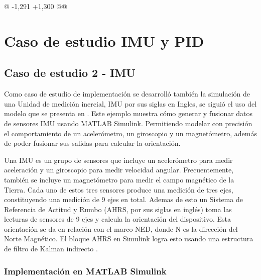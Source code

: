@ -1,291 +1,300 @@
\chapter{Caso de estudio IMU y PID}
\label{ch:especifico3}

\section{Caso de estudio 2 - IMU}

Como caso de estudio de implementación se desarrolló también la simulación de una Unidad de medición inercial, IMU por sus siglas en Ingles, se siguió el uso del modelo que se presenta en \cite{mathworks2024imu}. Este ejemplo muestra cómo generar y fusionar datos de sensores IMU usando MATLAB Simulink. Permitiendo modelar con precisión el comportamiento de un acelerómetro, un giroscopio y un magnetómetro, además de poder fusionar sus salidas para calcular la orientación.

Una IMU es un grupo de sensores que incluye un acelerómetro para medir aceleración y un giroscopio para medir velocidad angular. Frecuentemente, también se incluye un magnetómetro para medir el campo magnético de la Tierra. Cada uno de estos tres sensores produce una medición de tres ejes, constituyendo una medición de 9 ejes en total. Ademas de esto un Sistema de Referencia de Actitud y Rumbo (AHRS, por sus siglas en inglés) toma las lecturas de sensores de 9 ejes y calcula la orientación del dispositivo. Esta orientación se da en relación con el marco NED, donde N es la dirección del Norte Magnético. El bloque AHRS en Simulink logra esto usando una estructura de filtro de Kalman indirecto \cite{mathworks2024imu}.

\subsection{Implementación en MATLAB Simulink}

